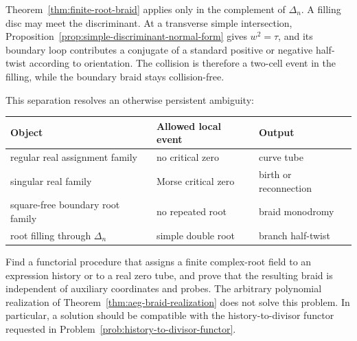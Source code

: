 Theorem~\ref{thm:finite-root-braid} applies only in the complement of
$\Delta_n$.  A filling disc may meet the discriminant.  At a transverse simple
intersection, Proposition~\ref{prop:simple-discriminant-normal-form} gives
$w^2=\tau$, and its boundary loop contributes a conjugate of a standard positive
or negative half-twist according to orientation.  The collision is therefore a
two-cell event in the filling, while the boundary braid stays collision-free.

This separation resolves an otherwise persistent ambiguity:
\begin{center}
\small
\begin{tabular}{lll}
\toprule
Object & Allowed local event & Output \\
\midrule
regular real assignment family & no critical zero & curve tube \\
singular real family & Morse critical zero & birth or reconnection \\
square-free boundary root family & no repeated root & braid monodromy \\
root filling through $\Delta_n$ & simple double root & branch half-twist \\
\bottomrule
\end{tabular}
\end{center}

\begin{problem}
\label{prob:natural-braid-monodromy}
Find a functorial procedure that assigns a finite complex-root field to an
expression history or to a real zero tube, and prove that the resulting braid is
independent of auxiliary coordinates and probes.  The arbitrary polynomial
realization of Theorem~\ref{thm:aeg-braid-realization} does not solve this problem.
In particular, a solution should be compatible with the history-to-divisor
functor requested in Problem~\ref{prob:history-to-divisor-functor}.
\end{problem}
